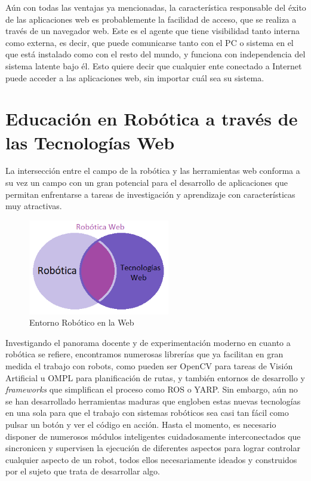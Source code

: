 Aún con todas las ventajas ya mencionadas, la característica responsable del éxito de las aplicaciones web es probablemente la facilidad de acceso, que se realiza a través de un navegador web. Este es el agente que tiene visibilidad tanto interna como externa, es decir, que puede comunicarse tanto con el PC o sistema en el que está instalado como con el resto del mundo, y funciona con independencia del sistema latente bajo él. Esto quiere decir que cualquier ente conectado a Internet puede acceder a las aplicaciones web, sin importar cuál sea su sistema. 

\section{Educación en Robótica a través de las Tecnologías Web}

La intersección entre el campo de la robótica y las herramientas web conforma a su vez un campo con un gran potencial para el desarrollo de aplicaciones que permitan enfrentarse a tareas de investigación y aprendizaje con características muy atractivas.

\begin{figure}[!hbtp]  \centering\noindent
    \includegraphics[width=0.55\textwidth]{figures/intersection.png}
    \caption{Entorno Robótico en la Web}
    \label{roboweb}
\end{figure}

Investigando el panorama docente y de experimentación moderno en cuanto a robótica se refiere, encontramos numerosas librerías que ya facilitan en gran medida el trabajo con robots, como pueden ser OpenCV para tareas de Visión Artificial u OMPL para planificación de rutas, y también entornos de desarrollo y \textit{frameworks} que simplifican el proceso como ROS o YARP. 
Sin embargo, aún no se han desarrollado herramientas maduras que engloben estas nuevas tecnologías en una sola para que el trabajo con sistemas robóticos sea casi tan fácil como pulsar un botón y ver el código en acción. Hasta el momento, es necesario disponer de numerosos módulos inteligentes cuidadosamente interconectados que sincronicen y supervisen la ejecución de diferentes aspectos para lograr controlar cualquier aspecto de un robot, todos ellos necesariamente ideados y construidos por el sujeto que trata de desarrollar algo.


